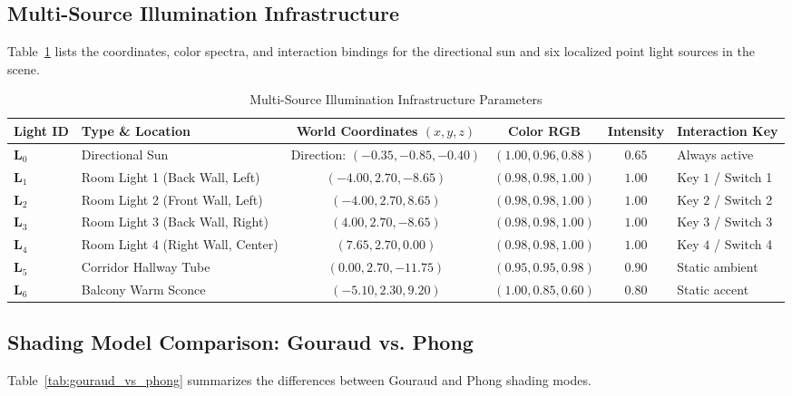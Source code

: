 \documentclass[11pt,a4paper]{article}
\begin{document}
\subsection{Multi-Source Illumination Infrastructure}
Table~\ref{tab:lights_config} lists the coordinates, color spectra, and interaction bindings for the directional sun and six localized point light sources in the scene.

\begin{table}[H]
\centering
\scriptsize
\caption{Multi-Source Illumination Infrastructure Parameters}
\label{tab:lights_config}
\begin{tabularx}{\textwidth}{llcccl}
\toprule
\rowcolor{tableheader}
\textcolor{tableheadertext}{\textbf{Light ID}} & 
\textcolor{tableheadertext}{\textbf{Type \& Location}} & 
\textcolor{tableheadertext}{\textbf{World Coordinates $(x,y,z)$}} & 
\textcolor{tableheadertext}{\textbf{Color RGB}} & 
\textcolor{tableheadertext}{\textbf{Intensity}} & 
\textcolor{tableheadertext}{\textbf{Interaction Key}} \\
\midrule
\rowcolor{lightgraybg}
$\mathbf{L}_0$ & Directional Sun & Direction: $(-0.35, -0.85, -0.40)$ & $(1.00, 0.96, 0.88)$ & $0.65$ & Always active \\
$\mathbf{L}_1$ & Room Light 1 (Back Wall, Left) & $(-4.00, 2.70, -8.65)$ & $(0.98, 0.98, 1.00)$ & $1.00$ & Key $1$ / Switch 1 \\
\rowcolor{lightgraybg}
$\mathbf{L}_2$ & Room Light 2 (Front Wall, Left) & $(-4.00, 2.70, 8.65)$ & $(0.98, 0.98, 1.00)$ & $1.00$ & Key $2$ / Switch 2 \\
$\mathbf{L}_3$ & Room Light 3 (Back Wall, Right) & $(4.00, 2.70, -8.65)$ & $(0.98, 0.98, 1.00)$ & $1.00$ & Key $3$ / Switch 3 \\
\rowcolor{lightgraybg}
$\mathbf{L}_4$ & Room Light 4 (Right Wall, Center) & $(7.65, 2.70, 0.00)$ & $(0.98, 0.98, 1.00)$ & $1.00$ & Key $4$ / Switch 4 \\
$\mathbf{L}_5$ & Corridor Hallway Tube & $(0.00, 2.70, -11.75)$ & $(0.95, 0.95, 0.98)$ & $0.90$ & Static ambient \\
\rowcolor{lightgraybg}
$\mathbf{L}_6$ & Balcony Warm Sconce & $(-5.10, 2.30, 9.20)$ & $(1.00, 0.85, 0.60)$ & $0.80$ & Static accent \\
\bottomrule
\end{tabularx}
\end{table}

\subsection{Shading Model Comparison: Gouraud vs. Phong}
Table~\ref{tab:gouraud_vs_phong} summarizes the differences between Gouraud and Phong shading modes.
\end{document}
